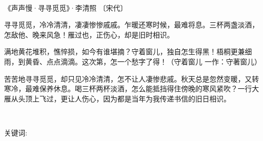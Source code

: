 \thispagestyle{plain}    %
\setcounter{page}{1}

\   %


《声声慢·寻寻觅觅》·李清照 〔宋代〕

寻寻觅觅，冷冷清清，凄凄惨惨戚戚。乍暖还寒时候，最难将息。三杯两盏淡酒，怎敌他、晚来风急！雁过也，正伤心，却是旧时相识。

满地黄花堆积，憔悴损，如今有谁堪摘？守着窗儿，独自怎生得黑！梧桐更兼细雨，到黄昏、点点滴滴。这次第，怎一个愁字了得！（守着窗儿 一作：守著窗儿）

苦苦地寻寻觅觅，却只见冷冷清清，怎不让人凄惨悲戚。秋天总是忽然变暖，又转寒冷，最难保养休息。喝三杯两杯淡酒，怎么能抵挡得住傍晚的寒风紧吹？一行大雁从头顶上飞过，更让人伤心，因为都是当年为我传递书信的旧日相识。

\

\noindent
关键词:
